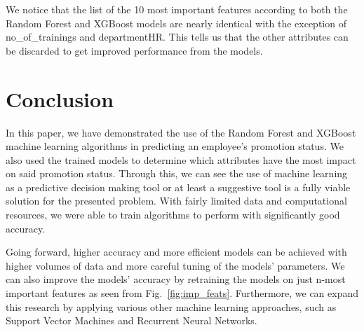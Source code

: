 \documentclass[runningheads]{llncs}
\begin{document}
\newpage

We notice that the list of the 10 most important features according to
both the Random Forest and XGBoost models are nearly identical with the
exception of no\_of\_trainings and departmentHR. This tells us that the
other attributes can be discarded to get improved performance from the
models.

\hypertarget{conclusion}{%
\section{Conclusion}\label{conclusion}}

In this paper, we have demonstrated the use of the Random Forest and
XGBoost machine learning algorithms in predicting an employee's
promotion status. We also used the trained models to determine which
attributes have the most impact on said promotion status. Through this,
we can see the use of machine learning as a predictive decision making
tool or at least a suggestive tool is a fully viable solution for the
presented problem. With fairly limited data and computational resources,
we were able to train algorithms to perform with significantly good
accuracy.

Going forward, higher accuracy and more efficient models can be achieved
with higher volumes of data and more careful tuning of the models'
parameters. We can also improve the models' accuracy by retraining the
models on just n-most important features as seen from
Fig.~\ref{fig:imp_feats}. Furthermore, we can expand this research by
applying various other machine learning approaches, such as Support
Vector Machines and Recurrent Neural Networks.
\end{document}
